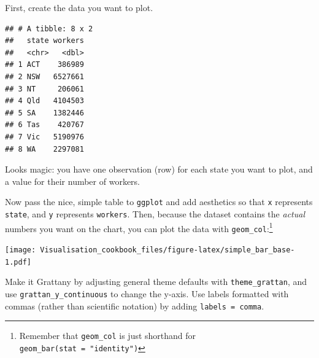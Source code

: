 \documentclass[]{book}
\newenvironment{Shaded}{\begin{snugshade}}{\end{snugshade}}
\newcommand{\DataTypeTok}[1]{\textcolor[rgb]{0.13,0.29,0.53}{#1}}
\newcommand{\DecValTok}[1]{\textcolor[rgb]{0.00,0.00,0.81}{#1}}
\newcommand{\KeywordTok}[1]{\textcolor[rgb]{0.13,0.29,0.53}{\textbf{#1}}}
\newcommand{\NormalTok}[1]{#1}
\newcommand{\OperatorTok}[1]{\textcolor[rgb]{0.81,0.36,0.00}{\textbf{#1}}}
\newcommand{\StringTok}[1]{\textcolor[rgb]{0.31,0.60,0.02}{#1}}
\let\rmarkdownfootnote\footnote%
\def\footnote{\protect\rmarkdownfootnote}
\begin{document}
First, create the data you want to plot.

\begin{Shaded}
\end{Shaded}

\begin{verbatim}
## # A tibble: 8 x 2
##   state workers
##   <chr>   <dbl>
## 1 ACT    386989
## 2 NSW   6527661
## 3 NT     206061
## 4 Qld   4104503
## 5 SA    1382446
## 6 Tas    420767
## 7 Vic   5190976
## 8 WA    2297081
\end{verbatim}

Looks magic: you have one observation (row) for each state you want to plot, and a value for their number of workers.

Now pass the nice, simple table to \texttt{ggplot} and add aesthetics so that \texttt{x} represents \texttt{state}, and \texttt{y} represents \texttt{workers}. Then, because the dataset contains the \emph{actual} numbers you want on the chart, you can plot the data with \texttt{geom\_col}:\footnote{Remember that \texttt{geom\_col} is just shorthand for \texttt{geom\_bar(stat\ =\ "identity")}}

\begin{Shaded}
\end{Shaded}

\texttt{[image: Visualisation\_cookbook\_files/figure-latex/simple\_bar\_base-1.pdf]}

Make it Grattany by adjusting general theme defaults with \texttt{theme\_grattan}, and use \texttt{grattan\_y\_continuous} to change the y-axis. Use labels formatted with commas (rather than scientific notation) by adding \texttt{labels\ =\ comma}.
\end{document}

